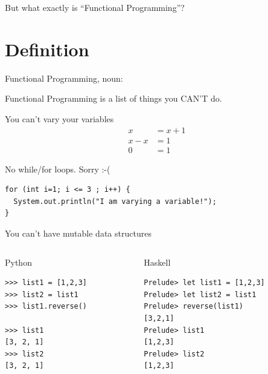 \documentclass[mathserif]{beamer}
\begin{document}
\begin{frame}

  \begin{center}
  {\Huge But what exactly is ``Functional Programming''?}
  \end{center}

\end{frame}

\section{Definition}

\begin{frame}{Functional Programming, noun:}

  \begin{exampleblock}{}
    {\Huge
      Functional Programming is a list of things you CAN’T do.
      }
    \vskip5mm
    \hspace*{}
  \end{exampleblock}
\end{frame}


\begin{frame}{You can't vary your variables}
  \begin{align*}
      x     & = x + 1\\
      x - x & = 1\\
      0     & = 1
  \end{align*}
\end{frame}

\begin{frame}[fragile]{No while/for loops. Sorry :-(}
  \begin{verbatim}
for (int i=1; i <= 3 ; i++) {
  System.out.println("I am varying a variable!");
}
  \end{verbatim}
\end{frame}

\begin{frame}[fragile]{You can't have mutable data structures}
     \begin{columns}[t] %
     \begin{column}[T]{5cm} %
Python
       \begin{verbatim}
>>> list1 = [1,2,3]
>>> list2 = list1
>>> list1.reverse()

>>> list1
[3, 2, 1]
>>> list2
[3, 2, 1]
       \end{verbatim}
     \end{column}

     \begin{column}[T]{5cm}
Haskell
       \begin{verbatim}
Prelude> let list1 = [1,2,3]
Prelude> let list2 = list1
Prelude> reverse(list1)
[3,2,1]
Prelude> list1
[1,2,3]
Prelude> list2
[1,2,3]
       \end{verbatim}
     \end{column}
     \end{columns}
\end{frame}
\end{document}

